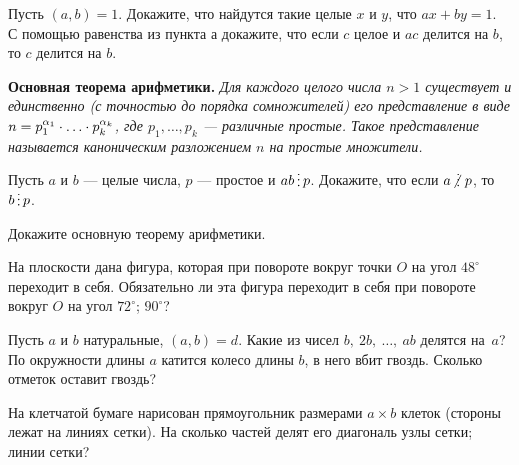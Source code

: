 \documentclass[12pt,a4paper]{article}
\begin{document}
Пусть $(a,b)=1$.
 Докажите, что найдутся такие целые $x$ и $y$, что $ax+by=1$.\\
 С помощью равенства из пункта а докажите, что если $c$ целое и $ac$ делится на $b$, то $c$ делится на $b$.

\smallskip
\noindent
{\bf Основная теорема арифметики.} {\em Для каждого целого числа $n > 1$ существует и единственно (с точностью до порядка сомножителей) его представление в виде $n=p_1^{\alpha_1}\cdot \ldots \cdot p_k^{\alpha_k}$, где $p_1,\dots,p_k$ --- различные простые. Такое представление называется каноническим разложением $n$ на простые множители.}

\smallskip

Пусть $a$ и $b$ --- целые числа, $p$ --- простое и $ab\del p$. Докажите, что если $a\!\not\!\del\, p$, то $b\del p$.


Докажите основную теорему арифметики.

\vspace*{-4pt}

\vspace*{-6pt}


 На плоскости дана фигура, которая
при повороте вокруг точки $O$ на угол $48^\circ$
переходит в себя.
Обязательно ли эта фигура переходит в себя при повороте
вокруг $O$ на угол
 $72^\circ$;
 $90^\circ$?


Пусть $a$ и $b$ натуральные, $(a,b)=d$.
 Какие из чисел $b,\ 2b,\ \ldots,\ ab$ делятся на~$a$?
 По окружности длины $a$ катится колесо длины $b$, в него вбит гвоздь.
Сколько отметок оставит гвоздь?

 На клетчатой бумаге нарисован прямоугольник
размерами $a\times b$
клеток (стороны лежат на линиях сетки).
На сколько частей делят его диагональ
 узлы сетки;
 линии сетки?
\end{document}
